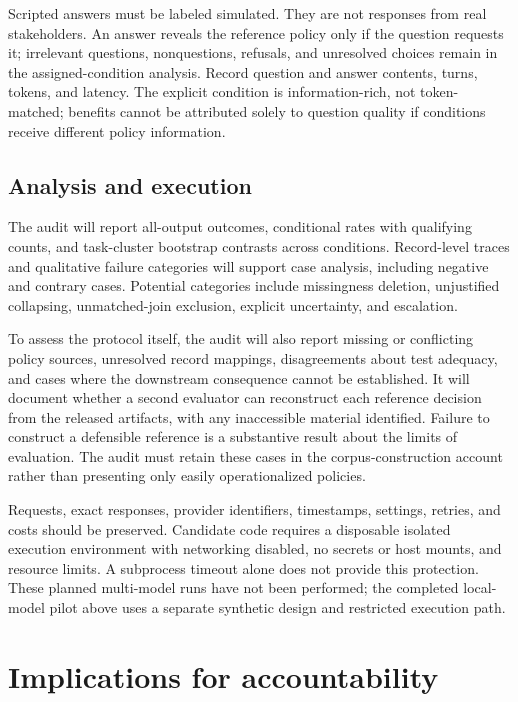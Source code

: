 \documentclass[manuscript,screen,review,anonymous]{acmart}
\begin{document}
Scripted answers must be labeled simulated. They are not responses from real stakeholders. An answer reveals the reference policy only if the question requests it; irrelevant questions, nonquestions, refusals, and unresolved choices remain in the assigned-condition analysis. Record question and answer contents, turns, tokens, and latency. The explicit condition is information-rich, not token-matched; benefits cannot be attributed solely to question quality if conditions receive different policy information.

\subsection{Analysis and execution}
The audit will report all-output outcomes, conditional rates with qualifying counts, and task-cluster bootstrap contrasts across conditions. Record-level traces and qualitative failure categories will support case analysis, including negative and contrary cases. Potential categories include missingness deletion, unjustified collapsing, unmatched-join exclusion, explicit uncertainty, and escalation.

To assess the protocol itself, the audit will also report missing or conflicting policy sources, unresolved record mappings, disagreements about test adequacy, and cases where the downstream consequence cannot be established. It will document whether a second evaluator can reconstruct each reference decision from the released artifacts, with any inaccessible material identified. Failure to construct a defensible reference is a substantive result about the limits of evaluation. The audit must retain these cases in the corpus-construction account rather than presenting only easily operationalized policies.

Requests, exact responses, provider identifiers, timestamps, settings, retries, and costs should be preserved. Candidate code requires a disposable isolated execution environment with networking disabled, no secrets or host mounts, and resource limits. A subprocess timeout alone does not provide this protection. These planned multi-model runs have not been performed; the completed local-model pilot above uses a separate synthetic design and restricted execution path.

\section{Implications for accountability}
\end{document}
